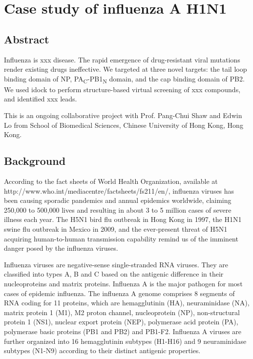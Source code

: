 \chapter{Case study of influenza A H1N1}
\label{influenza}

\section{Abstract}

Influenza is xxx disease. The rapid emergence of drug-resistant viral mutations render existing drugs ineffective. We targeted at three novel targets: the tail loop binding domain of NP, PA\textsubscript{C}-PB1\textsubscript{N} domain, and the cap binding domain of PB2. We used idock to perform structure-based virtual screening of xxx compounds, and identified xxx leads.

This is an ongoing collaborative project with Prof. Pang-Chui Shaw and Edwin Lo from School of Biomedical Sciences, Chinese University of Hong Kong, Hong Kong.

\section{Background}

According to the fact sheets of World Health Organization, available at http://www.who.int/mediacentre/factsheets/fs211/en/, influenza viruses has been causing sporadic pandemics and annual epidemics worldwide, claiming 250,000 to 500,000 lives and resulting in about 3 to 5 million cases of severe illness each year. The H5N1 bird flu outbreak in Hong Kong in 1997, the H1N1 swine flu outbreak in Mexico in 2009, and the ever-present threat of H5N1 acquiring human-to-human transmission capability remind us of the imminent danger posed by the influenza viruses. 

Influenza viruses are negative-sense single-stranded RNA viruses. They are classified into types A, B and C based on the antigenic difference in their nucleoproteins and matrix proteins. Influenza A is the major pathogen for most cases of epidemic influenza. The influenza A genome comprises 8 segments of RNA coding for 11 proteins, which are hemagglutinin (HA), neuraminidase (NA), matrix protein 1 (M1), M2 proton channel, nucleoprotein (NP), non-structural protein 1 (NS1), nuclear export protein (NEP), polymerase acid protein (PA), polymerase basic proteins (PB1 and PB2) and PB1-F2. Influenza A viruses are further organized into 16 hemagglutinin subtypes (H1-H16) and 9 neuraminidase subtypes (N1-N9) according to their distinct antigenic properties.

